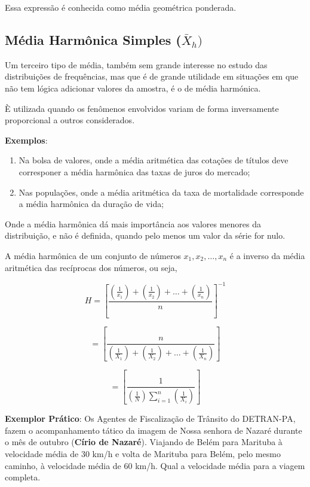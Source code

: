 Essa expressão é conhecida como média geométrica ponderada.


\newpage
\subsection{Média Harmônica Simples ($\bar{X}_{h})$}


\inic Um terceiro tipo de média, também sem grande interesse no estudo das
distribuições de frequências, mas que é de grande utilidade em situações em que não
tem lógica adicionar valores da amostra, é o de média harmónica.\vskip0.3cm



È utilizada quando os fenômenos envolvidos variam de forma inversamente proporcional a outros considerados.\vskip0.3cm

\textbf{Exemplos}:
\begin{enumerate}
  \item Na bolsa de valores, onde a média aritmética das cotações de títulos deve corresponer a média harmônica das taxas de juros do mercado;
  \item Nas populações, onde a média aritmética da taxa de mortalidade corresponde a média harmônica da duração de vida;
\end{enumerate}

Onde a média harmônica dá mais importância aos valores menores da distribuição, e não é definida, quando pelo menos um valor da série for nulo.\vskip0.3cm


A média harmônica de um conjunto de números $x_{1},x_{2},\ldots,x_{n}$ é a inverso da média
aritmética das recíprocas dos números, ou seja,


\begin{equation}\label{harmonica1}
H= \left[ \frac{  (\frac{1}{x_{1}})+(\frac{1}{x_{2}})+\ldots+(\frac{1}{x_{n}})  }{n} \right ]  ^{-1} 
\end{equation}

\begin{equation*}\label{harmonica1}
 =\left[  \frac{n}{(\frac{1}{X_{1}})+(\frac{1}{X_{2}})+\ldots+(\frac{1}{X_{n}})}  \right ]
\end{equation*}

\begin{equation*}\label{harmonica}
=\left[  \frac{1}{ (\frac{1}{N}) \sum_{i=1}^{n} (\frac{1}{X_{i}}) } \right ]
\end{equation*}
\vskip0.3cm

\textbf{Exemplor Prático}: Os Agentes de Fiscalização de Trânsito do DETRAN-PA, fazem o acompanhamento tático da imagem de Nossa senhora de Nazaré durante o mês de outubro (\textbf{Círio de Nazaré}). Viajando de Belém para Marituba à velocidade média de 30 km/h e volta de Marituba para Belém, pelo mesmo caminho, à velocidade média de 60 km/h. Qual a velocidade média para a viagem completa.


